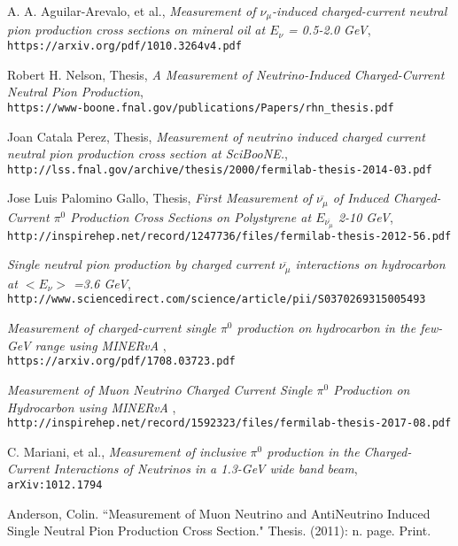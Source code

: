 \begin{thebibliography}{20}
  A. A. Aguilar-Arevalo, et al., \emph{Measurement of $\nu_\mu$-induced charged-current neutral pion production cross sections on mineral oil at $E_\nu$ = 0.5-2.0 GeV},\\
  \texttt{https://arxiv.org/pdf/1010.3264v4.pdf}

  Robert H. Nelson, Thesis, \emph{A Measurement of Neutrino-Induced Charged-Current Neutral Pion Production},\\
  \texttt{https://www-boone.fnal.gov/publications/Papers/rhn\_thesis.pdf}
  
  Joan Catala Perez, Thesis, \emph{Measurement of neutrino induced charged current neutral pion production cross section at SciBooNE.},\\
  \texttt{http://lss.fnal.gov/archive/thesis/2000/fermilab-thesis-2014-03.pdf}  

  Jose Luis Palomino Gallo, Thesis, \emph{First Measurement of $\overline{\nu_\mu}$ of Induced Charged-Current $\pi^0$ Production Cross Sections on Polystyrene at $E_{\overline{\nu_\mu}}$ 2-10 GeV},\\
  \texttt{http://inspirehep.net/record/1247736/files/fermilab-thesis-2012-56.pdf}  
  
   \emph{Single neutral pion production by charged current $\overline{\nu_\mu}$ interactions on hydrocarbon at $< E_\nu >$ =3.6 GeV},\\
  \texttt{http://www.sciencedirect.com/science/article/pii/S0370269315005493}  
  
   \emph{Measurement of charged-current single $\pi^0$ production on hydrocarbon in the few-GeV range using MINERvA },\\
  \texttt{https://arxiv.org/pdf/1708.03723.pdf}

   \emph{Measurement of Muon Neutrino Charged Current Single $\pi^0$ Production on Hydrocarbon using MINERvA },\\
  \texttt{http://inspirehep.net/record/1592323/files/fermilab-thesis-2017-08.pdf}

  
  C. Mariani, et al., \emph{Measurement of inclusive $\pi^0$ production in the Charged-Current Interactions of Neutrinos in a 1.3-GeV wide band beam},\\
  \texttt{arXiv:1012.1794}


Anderson, Colin. ``Measurement of Muon Neutrino and AntiNeutrino Induced Single Neutral Pion Production Cross Section." Thesis. (2011): n. page. Print.


\end{thebibliography}
